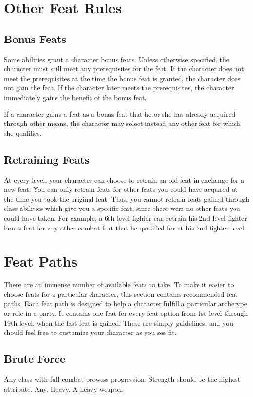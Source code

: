 \section{Other Feat Rules}

\subsection{Bonus Feats}
Some abilities grant a character bonus feats.
Unless otherwise specified, the character must still meet any prerequisites for the feat.
If the character does not meet the prerequisites at the time the bonus feat is granted, the character does not gain the feat.
If the character later meets the prerequisites, the character immediately gains the benefit of the bonus feat.

If a character gains a feat as a bonus feat that he or she has already acquired through other means, the character may select instead any other feat for which she qualifies.

\subsection{Retraining Feats}
At every level, your character can choose to retrain an old feat in exchange for a new feat.
You can only retrain feats for other feats you could have acquired at the time you took the original feat.
Thus, you cannot retrain feats gained through class abilities which give you a specific feat, since there were no other feats you could have taken.
For example, a 6th level fighter can retrain his 2nd level fighter bonus feat for any other combat feat that he qualified for at his 2nd fighter level.

\section{Feat Paths}

    There are an immense number of available feats to take.
    To make it easier to choose feats for a particular character, this section contains recommended feat paths.
    Each feat path is designed to help a character fulfill a particular archetype or role in a party.
    It contains one feat for every feat option from 1st level through 19th level, when the last feat is gained.
    These are simply guidelines, and you should feel free to customize your character as you see fit.

    \subsection{Brute Force}
         Any class with full combat prowess progression.
         Strength should be the highest attribute.
         Any.
         Heavy.
         A heavy weapon.

